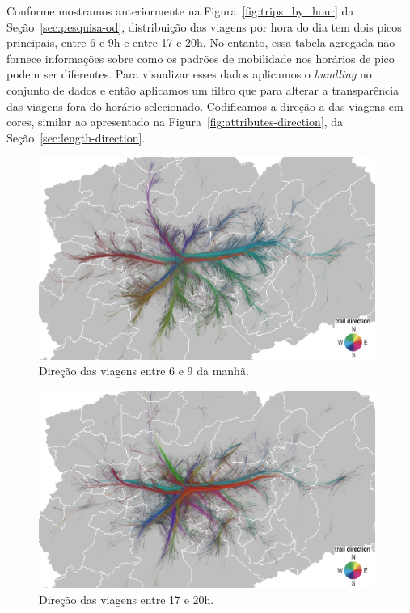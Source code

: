Conforme mostramos anteriormente na Figura~\ref{fig:trips_by_hour} da
Seção~\ref{sec:pesquisa-od}, distribuição das viagens por hora do dia tem dois
picos principais, entre 6 e 9h e entre 17 e 20h. No entanto, essa tabela
agregada não fornece informações sobre como os padrões de mobilidade nos
horários de pico podem ser diferentes. Para visualizar esses dados aplicamos o
\emph{bundling} no conjunto de dados e então aplicamos um filtro que para
alterar a transparência das viagens fora do horário selecionado. Codificamos a
direção a das viagens em cores, similar ao apresentado na
Figura~\ref{fig:attributes-direction}, da Seção~\ref{sec:length-direction}.

\begin{figure}[!htb]
  \centering
  \captionsetup{justification=centering}
  \includegraphics[width=0.98\textwidth]{../figuras/peak-hours-6h-to-9h-direction-leg.png}
  \caption{Direção das viagens entre 6 e 9 da manhã. \label{fig:peak-hours-6h-9h}}
\end{figure}
\vspace*{\floatsep}
\begin{figure}[!htb]
  \centering
  \captionsetup{justification=centering}
  \includegraphics[width=0.98\textwidth]{../figuras/peak-hours-17h-to-20h-direction-leg.png}
  \caption{Direção das viagens entre 17 e 20h. \label{fig:peak-hours-17h-20h}}
\end{figure}


